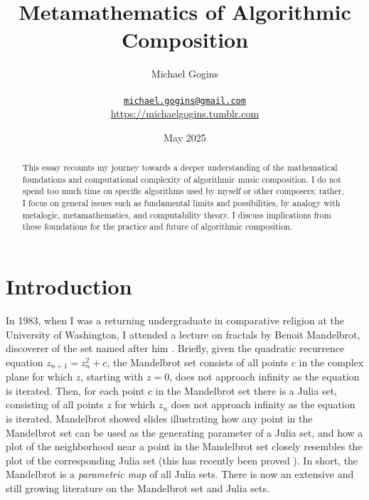 \documentclass[11pt]{scrartcl}
\begin{document}
\title{Metamathematics of Algorithmic Composition}
\author{Michael Gogins \\ \\ \texttt{\href{mailto:michael.gogins@gmail.com}{michael.gogins@gmail.com}}  \\ \url{https://michaelgogins.tumblr.com}}
\date{ May 2025}                                           %

\maketitle
\begin{abstract}
This essay recounts my journey towards a deeper understanding of the mathematical foundations and computational complexity of algorithmic music composition. I do not spend too much time on specific algorithms used by myself or other composers; rather, I focus on general issues such as fundamental limits and possibilities, by analogy with metalogic, metamathematics, and computability theory. I discuss  implications from these foundations for the practice and future of algorithmic composition. 
\end{abstract}

\section*{Introduction}

In 1983, when I was a returning undergraduate in comparative religion at the University of Washington, I attended a lecture on fractals by Benoit Mandelbrot, discoverer of the set named after him \parencite{citeulike:580392, peitgen2004mandelbrot}. Briefly, given the quadratic recurrence equation $z_{n+1} = z_n^2 + c$, the Mandelbrot set consists of all points $c$ in the complex plane for which $z$, starting with $z = 0$, does not approach infinity as the equation is iterated. Then, for each point $c$ in the Mandelbrot set there is a Julia set, consisting of all points $z$ for which $z_n$ does not approach infinity as the equation is iterated.  Mandelbrot showed slides illustrating how any point in the Mandelbrot set can be used as the generating parameter of a Julia set, and how a plot of the neighborhood near a point in the Mandelbrot set closely resembles the plot of the corresponding Julia set \parencite{lei1990similarity} (this has recently been proved \parencite{kawahira2018julia}). In short, the Mandelbrot is a \emph{parametric map} of all Julia sets. There is now an extensive and still growing literature on the Mandelbrot set and Julia sets. 
\end{document}
